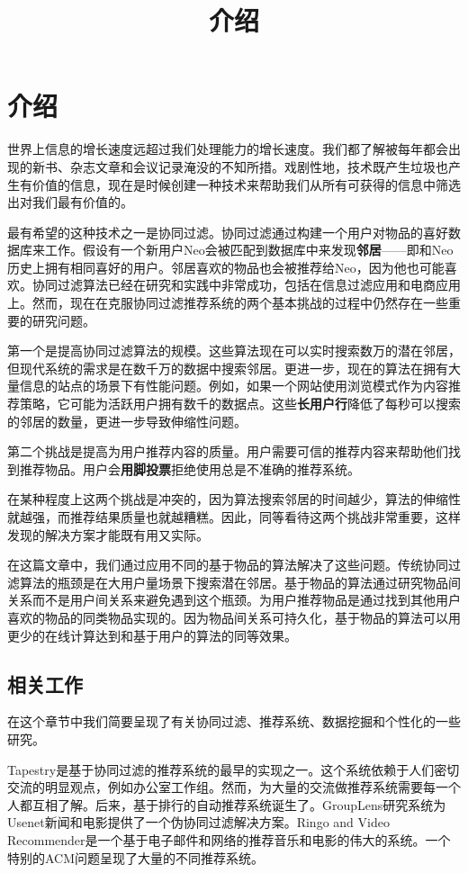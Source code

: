 \documentclass{../upctrans}
\title{介绍}
\begin{document}
\section{介绍}

世界上信息的增长速度远超过我们处理能力的增长速度。我们都了解被每年都会出现的新书、杂志文章和会议记录淹没的不知所措。戏剧性地，技术既产生垃圾也产生有价值的信息，现在是时候创建一种技术来帮助我们从所有可获得的信息中筛选出对我们最有价值的。

最有希望的这种技术之一是协同过滤。协同过滤通过构建一个用户对物品的喜好数据库来工作。假设有一个新用户Neo会被匹配到数据库中来发现{\bfseries 邻居}——即和Neo历史上拥有相同喜好的用户。邻居喜欢的物品也会被推荐给Neo，因为他也可能喜欢。协同过滤算法已经在研究和实践中非常成功，包括在信息过滤应用和电商应用上。然而，现在在克服协同过滤推荐系统的两个基本挑战的过程中仍然存在一些重要的研究问题。

第一个是提高协同过滤算法的规模。这些算法现在可以实时搜索数万的潜在邻居，但现代系统的需求是在数千万的数据中搜索邻居。更进一步，现在的算法在拥有大量信息的站点的场景下有性能问题。例如，如果一个网站使用浏览模式作为内容推荐策略，它可能为活跃用户拥有数千的数据点。这些{\bfseries 长用户行}降低了每秒可以搜索的邻居的数量，更进一步导致伸缩性问题。

第二个挑战是提高为用户推荐内容的质量。用户需要可信的推荐内容来帮助他们找到推荐物品。用户会{\bfseries 用脚投票}拒绝使用总是不准确的推荐系统。

在某种程度上这两个挑战是冲突的，因为算法搜索邻居的时间越少，算法的伸缩性就越强，而推荐结果质量也就越糟糕。因此，同等看待这两个挑战非常重要，这样发现的解决方案才能既有用又实际。

在这篇文章中，我们通过应用不同的基于物品的算法解决了这些问题。传统协同过滤算法的瓶颈是在大用户量场景下搜索潜在邻居。基于物品的算法通过研究物品间关系而不是用户间关系来避免遇到这个瓶颈。为用户推荐物品是通过找到其他用户喜欢的物品的同类物品实现的。因为物品间关系可持久化，基于物品的算法可以用更少的在线计算达到和基于用户的算法的同等效果。

\subsection{相关工作}

在这个章节中我们简要呈现了有关协同过滤、推荐系统、数据挖掘和个性化的一些研究。

Tapestry是基于协同过滤的推荐系统的最早的实现之一。这个系统依赖于人们密切交流的明显观点，例如办公室工作组。然而，为大量的交流做推荐系统需要每一个人都互相了解。后来，基于排行的自动推荐系统诞生了。GroupLens研究系统为Usenet新闻和电影提供了一个伪协同过滤解决方案。Ringo and Video Recommender是一个基于电子邮件和网络的推荐音乐和电影的伟大的系统。一个特别的ACM问题呈现了大量的不同推荐系统。
\end{document}
